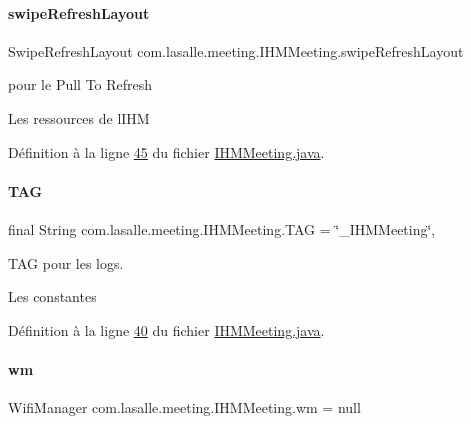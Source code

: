 \paragraph{\texorpdfstring{swipe\+Refresh\+Layout}{swipeRefreshLayout}}
{\footnotesize\ttfamily Swipe\+Refresh\+Layout com.\+lasalle.\+meeting.\+I\+H\+M\+Meeting.\+swipe\+Refresh\+Layout\hspace{0.3cm}{\ttfamily [private]}}



pour le Pull To Refresh 

Les ressources de l\textquotesingle{}I\+HM 

Définition à la ligne \hyperlink{_i_h_m_meeting_8java_source_l00045}{45} du fichier \hyperlink{_i_h_m_meeting_8java_source}{I\+H\+M\+Meeting.\+java}.

\mbox{\label{classcom_1_1lasalle_1_1meeting_1_1_i_h_m_meeting_a239eafcb0ccc896bdba538d1c0f08e65}} 
\paragraph{\texorpdfstring{T\+AG}{TAG}}
{\footnotesize\ttfamily final String com.\+lasalle.\+meeting.\+I\+H\+M\+Meeting.\+T\+AG = \char`\"{}\+\_\+\+I\+H\+M\+Meeting\char`\"{}\hspace{0.3cm}{\ttfamily [static]}, {\ttfamily [private]}}



T\+AG pour les logs. 

Les constantes 

Définition à la ligne \hyperlink{_i_h_m_meeting_8java_source_l00040}{40} du fichier \hyperlink{_i_h_m_meeting_8java_source}{I\+H\+M\+Meeting.\+java}.

\mbox{\label{classcom_1_1lasalle_1_1meeting_1_1_i_h_m_meeting_acdbac7f6ea8e7a8ed99e0ceaaf0f9f97}} 
\paragraph{\texorpdfstring{wm}{wm}}
{\footnotesize\ttfamily Wifi\+Manager com.\+lasalle.\+meeting.\+I\+H\+M\+Meeting.\+wm = null\hspace{0.3cm}{\ttfamily [private]}}



